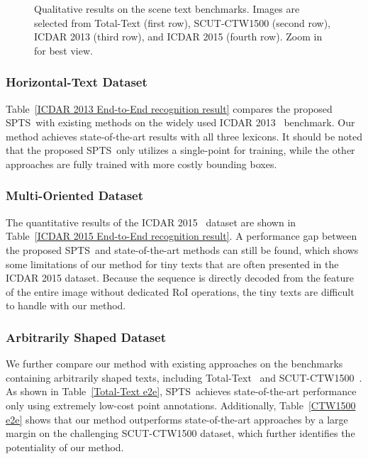 \documentclass[sigconf]{acmart}
\newcommand{\methodName}{SPTS}
\begin{document}
\begin{figure*}[t!]
    \caption{Qualitative results on the scene text benchmarks. Images are selected from Total-Text (first row), SCUT-CTW1500 (second row), ICDAR 2013 (third row), and ICDAR 2015 (fourth row). Zoom in for best view.}
    \label{fig_vis}
\end{figure*}



\subsubsection{Horizontal-Text Dataset}
Table~\ref{ICDAR 2013 End-to-End recognition result} compares the proposed \methodName\ with existing methods on the widely used ICDAR 2013~\cite{karatzas2013icdar} benchmark. Our method achieves state-of-the-art results with all three lexicons. It should be noted that the proposed \methodName\ only utilizes a single-point for training, while the other approaches are fully trained with more costly bounding boxes.

\subsubsection{Multi-Oriented Dataset}\label{sec:multi-orientd dataset}
The quantitative results of the ICDAR 2015~\cite{karatzas2015icdar} dataset are shown in Table~\ref{ICDAR 2015 End-to-End recognition result}. A performance gap between the proposed \methodName\ and state-of-the-art methods can still be found, which shows some limitations of our method for tiny texts that are often presented in the ICDAR 2015 dataset. Because the sequence is directly decoded from the feature of the entire image without dedicated RoI operations, the tiny texts are difficult to handle with our method.


\subsubsection{Arbitrarily Shaped Dataset}
We further compare our method with existing approaches on the benchmarks containing arbitrarily shaped texts, including Total-Text~\cite{ch2017total} and SCUT-CTW1500~\cite{liu2019curved}. As shown in Table~\ref{Total-Text e2e}, \methodName\ achieves state-of-the-art performance only using extremely low-cost point annotations. Additionally, Table~\ref{CTW1500 e2e} shows that our method outperforms state-of-the-art approaches by a large margin on the challenging SCUT-CTW1500 dataset, which further identifies the potentiality of our method.
\end{document}
